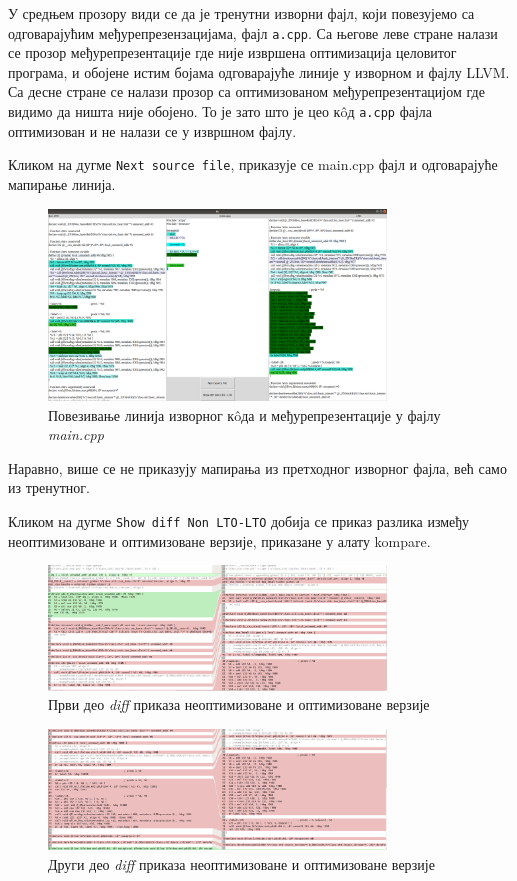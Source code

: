 \documentclass[12pt,oneside]{memoir}
\begin{document}
У средњем прозору види се да је тренутни изворни фајл, који повезујемо са одговарајућим
међурепрезензацијама, фајл \texttt{a.cpp}.
Са његове леве стране налази се прозор међурепрезентације где није извршена оптимизација
целовитог програма, и обојене истим бојама одговарајуће линије у изворном и
фајлу LLVM.
Са десне стране се налази прозор са оптимизованом међурепрезентацијом где видимо
да ништа није обојено.
То је зато што је цео к\^{o}д  \texttt{a.cpp} фајла оптимизован
и не налази се у извршном фајлу.

Кликом на дугме \texttt{Next source file}, приказује се main.cpp фајл и одговарајуће 
мапирање линија.
\begin{figure}[!ht]
  \centering
  \includegraphics[width=0.8\textwidth]{main_cpp.png}
  \caption{Повезивање линија изворног к\^{o}да и међурепрезентације у фајлу \textit{main.cpp } }
  \label{fig:grafikon}
\end{figure}
Наравно, више се не приказују мапирања из претходног изворног фајла, већ само из
тренутног.

Кликом на дугме \texttt{Show diff Non LTO-LTO} добија се приказ разлика између неоптимизоване и оптимизоване
верзије, приказане у алату kompare.
\begin{figure}[!ht]
  \centering
  \includegraphics[width=0.8\textwidth]{diff_1.png}
  \caption{Први део \textit{diff} приказа неоптимизоване и оптимизоване верзије }
  \label{fig:grafikon}
\end{figure}
\begin{figure}[!ht]
  \centering
  \includegraphics[width=0.8\textwidth]{diff_2.png}
  \caption{Други део \textit{diff} приказа неоптимизоване и оптимизоване верзије}
  \label{fig:grafikon}
\end{figure}
\end{document}
